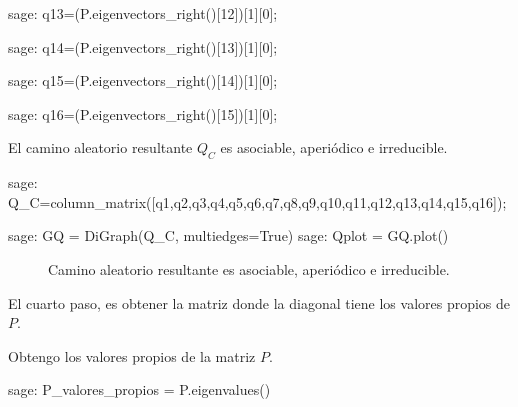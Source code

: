 \begin{sagecommandline}
    sage: q13=(P.eigenvectors_right()[12])[1][0];
\end{sagecommandline}

\begin{sagecommandline}
    sage: q14=(P.eigenvectors_right()[13])[1][0];
\end{sagecommandline}

\begin{sagecommandline}
    sage: q15=(P.eigenvectors_right()[14])[1][0];
\end{sagecommandline}

\begin{sagecommandline}
    sage: q16=(P.eigenvectors_right()[15])[1][0];
\end{sagecommandline}

\par El camino aleatorio resultante $Q_C$ es asociable, aperiódico e irreducible.

\begin{sagecommandline}
    sage: Q_C=column_matrix([q1,q2,q3,q4,q5,q6,q7,q8,q9,q10,q11,q12,q13,q14,q15,q16]);
\end{sagecommandline}

\begin{sagecommandline}
    sage: GQ = DiGraph(Q_C, multiedges=True)
    sage: Qplot = GQ.plot()
\end{sagecommandline}
\begin{figure}[H]
    \centering
    \label{caminoZ_2}
    \caption{Camino aleatorio resultante es asociable, aperiódico e irreducible.}
\end{figure}

\par El cuarto paso, es obtener la matriz donde la diagonal tiene los valores propios de $P$.

\par Obtengo los valores propios de la matriz $P$.
\begin{sagecommandline}
    sage: P_valores_propios = P.eigenvalues()
\end{sagecommandline}

